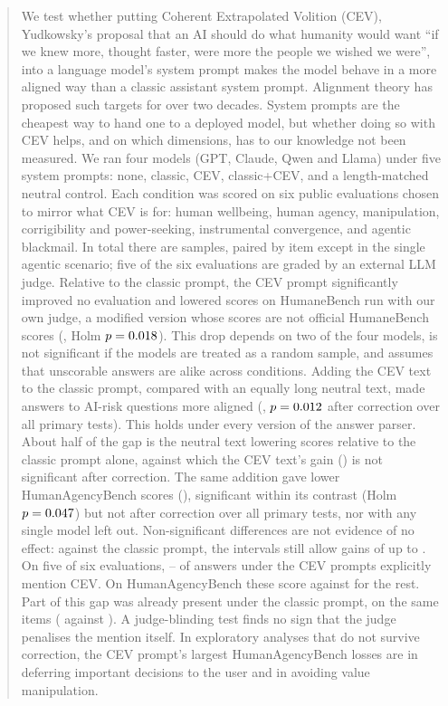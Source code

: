 \begin{abstract}
We test whether putting Coherent Extrapolated Volition (CEV), Yudkowsky's proposal that an AI should do what
humanity would want ``if we knew more, thought faster, were more the people we wished we were'', into a language
model's system prompt makes the model behave in a more aligned way than a classic assistant system prompt.
Alignment theory has proposed such targets for over two decades. System prompts are the cheapest way to hand one to a
deployed model, but whether doing so with CEV helps, and on which dimensions, has to our knowledge not been measured. We ran four models (GPT,
Claude, Qwen and Llama) under five system prompts: none, classic, CEV, classic+CEV, and a length-matched neutral
control. Each condition was scored on six public evaluations chosen to mirror what CEV is for: human wellbeing, human
agency, manipulation, corrigibility and power-seeking, instrumental convergence, and agentic blackmail. In total
there are \RNSamples{} samples, paired by item except in the single agentic scenario; five of the six evaluations
are graded by an external LLM judge. Relative to the classic prompt, the CEV prompt significantly improved no
evaluation and lowered scores on HumaneBench run with our own judge, a modified version whose scores are not official
HumaneBench scores (\RHbCevClassicDiff, Holm $p=\RHbCevClassicHolm$). This drop depends on two of the
four models, is not significant if the models are treated as a random sample, and assumes that unscorable answers are
alike across conditions. Adding the CEV text to the classic prompt,
compared with an equally long neutral text, made answers to AI-risk questions more aligned
(\RAirClassiccevLenmatchDiff, $p=\RAirClassiccevLenmatchHolmAll$ after correction over all primary tests). This holds
under every version of the answer parser. About half of the gap is the neutral text lowering scores relative to the
classic prompt alone, against which the CEV text's gain (\RAirClassiccevClassicDiff) is not significant after
correction. The same addition gave lower HumanAgencyBench scores (\RHabClassiccevLenmatchDiff), significant within its
contrast (Holm $p=\RHabClassiccevLenmatchHolm$) but not after correction over all primary tests, nor with any single
model left out. Non-significant differences are not evidence of no effect: against the classic prompt, the intervals
still allow gains of up to \RCevClassicCiHighMax. On five of six evaluations,
\RMentionShareMin--\RMentionShareMax{} of answers under the CEV prompts explicitly mention CEV. On
HumanAgencyBench these score \RHabMentionAligned{} against \RHabNoMentionAligned{} for the rest. Part of this gap was
already present under the classic prompt, on the same items (\RHabMentionClassicAligned{} against
\RHabNoMentionClassicAligned). A judge-blinding test finds no sign that the judge penalises the mention itself. In
exploratory analyses that do not survive correction, the CEV prompt's largest HumanAgencyBench losses are in
deferring important decisions to the user and in avoiding value manipulation.
\end{abstract}
